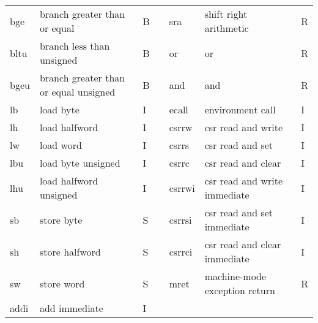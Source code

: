\documentclass[../specifications.tex]{subfiles}
\begin{document}
\begin{table*}[t]
\begin{tabular}{|l|l|l|llll}
    bge   & branch greater than or equal          & B  & \multicolumn{1}{l|}{} & \multicolumn{1}{l|}{sra}    & \multicolumn{1}{l|}{shift right arithmetic}        & \multicolumn{1}{l|}{R}  \\
    bltu  & branch less than unsigned             & B  & \multicolumn{1}{l|}{} & \multicolumn{1}{l|}{or}     & \multicolumn{1}{l|}{or}                            & \multicolumn{1}{l|}{R}  \\
    bgeu  & branch greater than or equal unsigned & B  & \multicolumn{1}{l|}{} & \multicolumn{1}{l|}{and}    & \multicolumn{1}{l|}{and}                           & \multicolumn{1}{l|}{R}  \\
    lb    & load byte                             & I  & \multicolumn{1}{l|}{} & \multicolumn{1}{l|}{ecall}  & \multicolumn{1}{l|}{environment call}              & \multicolumn{1}{l|}{I}  \\
    lh    & load halfword                         & I  & \multicolumn{1}{l|}{} & \multicolumn{1}{l|}{csrrw}  & \multicolumn{1}{l|}{csr read and write}            & \multicolumn{1}{l|}{I}  \\
    lw    & load word                             & I  & \multicolumn{1}{l|}{} & \multicolumn{1}{l|}{csrrs}  & \multicolumn{1}{l|}{csr read and set}              & \multicolumn{1}{l|}{I}  \\
    lbu   & load byte unsigned                    & I  & \multicolumn{1}{l|}{} & \multicolumn{1}{l|}{csrrc}  & \multicolumn{1}{l|}{csr read and clear}            & \multicolumn{1}{l|}{I}  \\
    lhu   & load halfword unsigned                & I  & \multicolumn{1}{l|}{} & \multicolumn{1}{l|}{csrrwi} & \multicolumn{1}{l|}{csr read and write immediate}  & \multicolumn{1}{l|}{I}  \\
    sb    & store byte                            & S  & \multicolumn{1}{l|}{} & \multicolumn{1}{l|}{csrrsi} & \multicolumn{1}{l|}{csr read and set immediate}    & \multicolumn{1}{l|}{I}  \\
    sh    & store halfword                        & S  & \multicolumn{1}{l|}{} & \multicolumn{1}{l|}{csrrci} & \multicolumn{1}{l|}{csr read and clear immediate}  & \multicolumn{1}{l|}{I}  \\
    sw    & store word                            & S  & \multicolumn{1}{l|}{} & \multicolumn{1}{l|}{mret}   & \multicolumn{1}{l|}{machine-mode exception return} & \multicolumn{1}{l|}{R}  \\ \cline{5-7}
    addi  & add immediate                         & I  &                       &                             &                                                    &                         \\

\end{tabular}
\end{table*}
\end{document}
